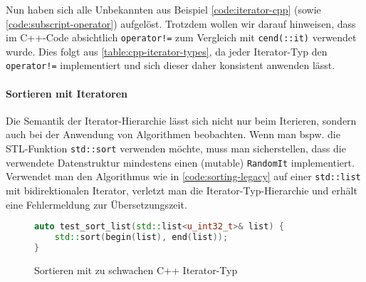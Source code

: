 \documentclass[runningheads]{llncs}
\begin{document}
Nun haben sich alle Unbekannten aus Beispiel \ref{code:iterator-cpp} (sowie \ref{code:subscript-operator}) aufgelöst.
Trotzdem wollen wir darauf hinweisen, dass im C++-Code absichtlich \texttt{operator!=} zum Vergleich mit \texttt{cend(::it)} verwendet wurde.
Dies folgt aus \autoref{table:cpp-iterator-types}, da jeder Iterator-Typ den \texttt{operator!=} implementiert und sich dieser daher konsistent anwenden lässt.

\paragraph{Sortieren mit Iteratoren}

Die Semantik der Iterator-Hierarchie lässt sich nicht nur beim Iterieren, sondern auch bei der Anwendung von Algorithmen beobachten.
Wenn man bspw. die STL-Funktion \texttt{std::sort} verwenden möchte, muss man sicherstellen, dass die verwendete Datenstruktur mindestens einen (mutable) \texttt{RandomIt} implementiert.
Verwendet man den Algorithmus wie in \autoref{code:sorting-legacy} auf einer \texttt{std::list} mit bidirektionalen Iterator, verletzt man die Iterator-Typ-Hierarchie und erhält eine Fehlermeldung zur Übersetzungszeit.

\begin{figure}
	\vspace{-.5em}
	\caption{Sortieren mit zu schwachen C++ Iterator-Typ}
	\label{code:sorting-legacy}
	\begin{lstlisting}[language=C++]
auto test_sort_list(std::list<u_int32_t>& list) {
	std::sort(begin(list), end(list));
}\end{lstlisting}
	\vspace{-1em}
\end{figure}

%
%
\end{document}
